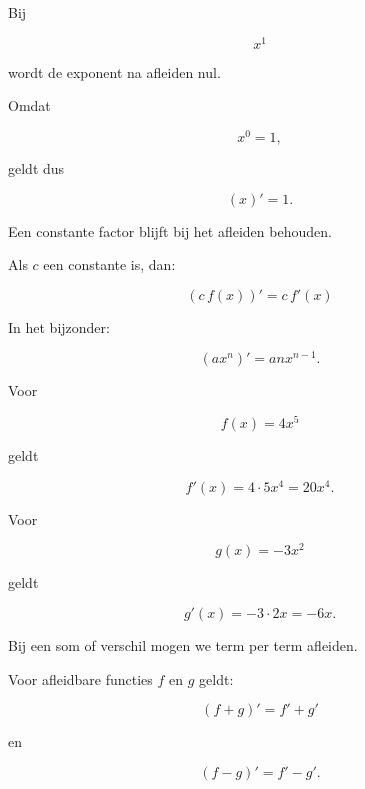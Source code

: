 \documentclass{ximera}
\begin{document}
\begin{opmerking}

Bij

\[
x^1
\]

wordt de exponent na afleiden nul.

Omdat

\[
x^0=1,
\]

geldt dus

\[
(x)'=1.
\]

\end{opmerking}




Een constante factor blijft bij het afleiden behouden.

\begin{eigenschap}

Als $c$ een constante is, dan:

\[
\boxed{
(c\,f(x))'=c\,f'(x)
}
\]

\end{eigenschap}


In het bijzonder:

\[
(ax^n)'=a n x^{n-1}.
\]


\begin{voorbeeld}

Voor

\[
f(x)=4x^5
\]

geldt

\[
f'(x)=4\cdot5x^4=20x^4.
\]

Voor

\[
g(x)=-3x^2
\]

geldt

\[
g'(x)=-3\cdot2x=-6x.
\]

\end{voorbeeld}




Bij een som of verschil mogen we term per term afleiden.

\begin{eigenschap}

Voor afleidbare functies $f$ en $g$ geldt:

\[
\boxed{
(f+g)'=f'+g'
}
\]

en

\[
\boxed{
(f-g)'=f'-g'.
}
\]

\end{eigenschap}
\end{document}

